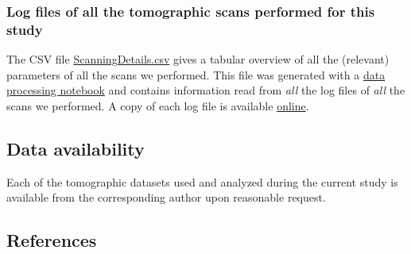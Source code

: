 \hypertarget{log-files-of-all-the-tomographic-scans-performed-for-this-study}{%
\subsubsection{Log files of all the tomographic scans performed for this study}\label{log-files-of-all-the-tomographic-scans-performed-for-this-study}}

The CSV file \href{https://github.com/microct-ana-unibe-ch/microvasculature-manuscript/blob/main/content/data/ScanningDetails.csv}{ScanningDetails.csv} gives a tabular overview of all the (relevant) parameters of all the scans we performed.
This file was generated with a \href{https://github.com/habi/BrukerSkyScanLogfileRuminator}{data processing notebook} and contains information read from \emph{all} the log files of \emph{all} the scans we performed.
A copy of each log file is available \href{https://github.com/microct-ana-unibe-ch/microvasculature-manuscript/tree/main/content/data}{online}.

\hypertarget{data-availability}{%
\subsection{Data availability}\label{data-availability}}

Each of the tomographic datasets used and analyzed during the current study is available from the corresponding author upon reasonable request.

\hypertarget{references}{%
\subsection{References}\label{references}}

